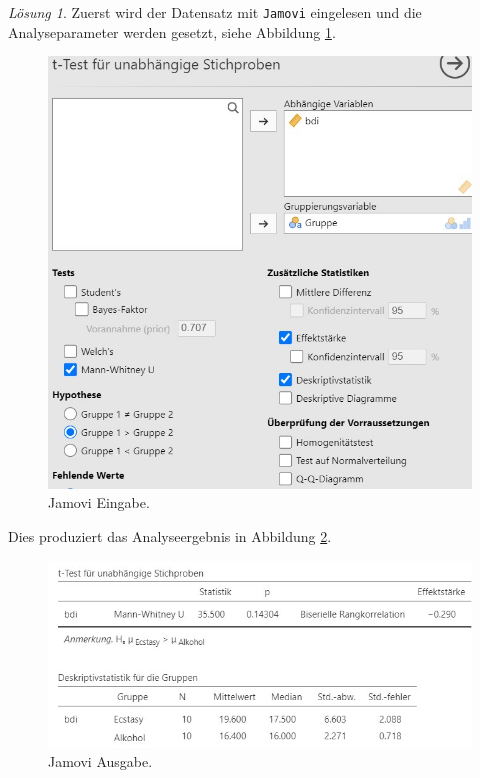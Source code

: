 \documentclass[
]{book}
\theoremstyle{definition}
\theoremstyle{definition}
\theoremstyle{definition}
\theoremstyle{definition}
\theoremstyle{remark}
\newtheorem*{solution}{Lösung}
\begin{document}
\begin{solution}

Zuerst wird der Datensatz mit \texttt{Jamovi} eingelesen und die Analyseparameter werden gesetzt, siehe Abbildung \ref{fig:sol-depression-ecstasy-input}.

\begin{figure}
\includegraphics[width=1\linewidth]{figures/07-exr-depression-ecstasy-jmv-input} \caption{Jamovi Eingabe.}\label{fig:sol-depression-ecstasy-input}
\end{figure}

Dies produziert das Analyseergebnis in Abbildung \ref{fig:sol-depression-ecstasy-output}.

\begin{figure}
\includegraphics[width=1\linewidth]{figures/07-exr-depression-ecstasy-jmv-output} \caption{Jamovi Ausgabe.}\label{fig:sol-depression-ecstasy-output}
\end{figure}


\end{solution}
\end{document}
